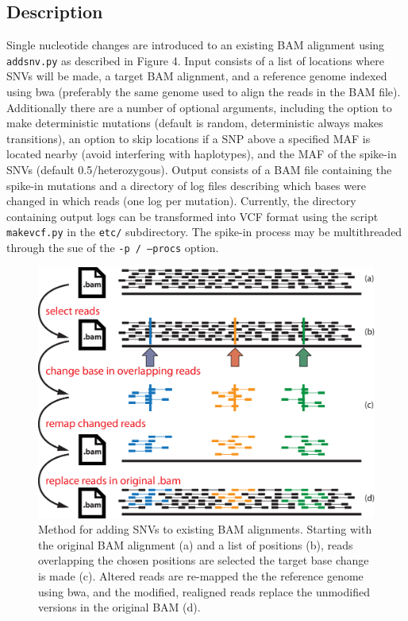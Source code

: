 \documentclass[letterpaper,11pt]{article}
\begin{document}
\subsection{Description}
    Single nucleotide changes are introduced to an existing BAM alignment using \texttt {addsnv.py} as described in Figure 4. Input consists of a list of locations where SNVs will be made, a target BAM alignment, and a reference genome indexed using bwa (preferably the same genome used to align the reads in the BAM file). Additionally there are a number of optional arguments, including the option to make deterministic mutations (default is random, deterministic always makes transitions), an option to skip locations if a SNP above a specified MAF is located nearby (avoid interfering with haplotypes), and the MAF of the spike-in SNVs (default 0.5/heterozygous). Output consists of a BAM file containing the spike-in mutations and a directory of log files describing which bases were changed in which reads (one log per mutation). Currently, the directory containing output logs can be transformed into VCF format using the script \texttt {makevcf.py} in the \texttt {etc/} subdirectory. The spike-in process may be multithreaded through the sue of the \texttt {-p / --procs} option.

\begin{figure}[!h]
\centering
\includegraphics[width=5.5in]{bamsurgeon_snv.eps}
\caption{Method for adding SNVs to existing BAM alignments. Starting with the original BAM alignment (a) and a list of positions (b), reads overlapping the chosen positions are selected the target base change is made (c). Altered reads are re-mapped the the reference genome using bwa, and the modified, realigned reads replace the unmodified versions in the original BAM (d).}
\end{figure}
\end{document}

